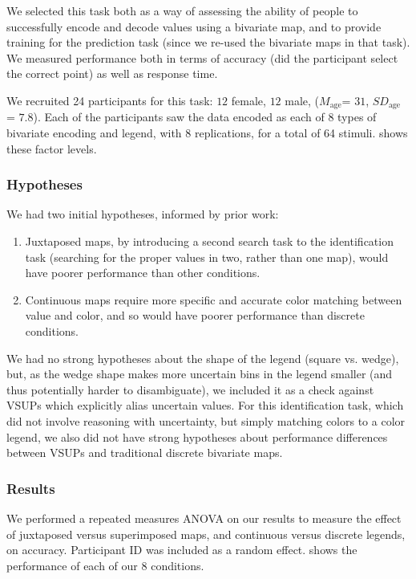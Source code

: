 We selected this task both as a way of assessing the ability of people to successfully encode and decode values using a bivariate map, and to provide training for the prediction task (since we re-used the bivariate maps in that task). We measured performance both in terms of accuracy (did the participant select the correct point) as well as response time.

We recruited 24 participants for this task: $12$ female, $12$ male, ($M_{\text{age}}$= $31$, $SD_{\text{age}}$ = $7.8$). Each of the participants saw the data encoded as each of 8 types of bivariate encoding and legend, with 8 replications, for a total of 64 stimuli.  shows these factor levels.

\subsubsection{Hypotheses}

We had two initial hypotheses, informed by prior work:

\begin{enumerate}
	\item Juxtaposed maps, by introducing a second search task to the identification task (searching for the proper values in two, rather than one map), would have poorer performance than other conditions.
	\item Continuous maps require more specific and accurate color matching between value and color, and so would have poorer performance than discrete conditions.
\end{enumerate}

We had no strong hypotheses about the shape of the legend (square vs. wedge), but, as the wedge shape makes more uncertain bins in the legend smaller (and thus potentially harder to disambiguate), we included it as a check against VSUPs which explicitly alias uncertain values. For this identification task, which did not involve reasoning with uncertainty, but simply matching colors to a color legend, we also did not have strong hypotheses about performance differences between VSUPs and traditional discrete bivariate maps.

\subsubsection{Results}
\taskOneFig

We performed a repeated measures ANOVA on our results to measure the effect of juxtaposed versus superimposed maps, and continuous versus discrete legends, on accuracy. Participant ID was included as a random effect.  shows the performance of each of our 8 conditions.

